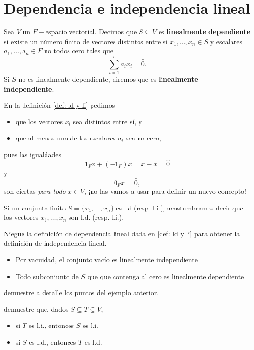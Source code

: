\section{Dependencia e independencia lineal}

\begin{defi}
	\label{def: ld y li}
Sea $V$ un $F-$espacio vectorial. Decimos que $S \subseteq V$
es \textbf{linealmente dependiente} si existe un número
finito de vectores distintos entre si $x_{1}, \ldots , x_{n} \in S$
y escalares $a_{1}, \ldots , a_{n} \in F$ no todos cero
tales que 
\[
\sum_{i=1}^{n} a_{i}x_{i} = \hat{0}.
\]
Si $S$ no es linealmente dependiente, diremos que es
\textbf{linealmente independiente}.
\end{defi}

En la definición \ref{def: ld y li}
pedimos
\begin{itemize}
	\item que los vectores $x_{i}$ sea distintos entre sí, y
	\item que al menos uno de los escalares $a_{i}$ sea no cero,
\end{itemize}
pues las igualdades
	\[
	1_{F} x + (-1_{F}) x = x - x = \hat{0}
	\]
	y
	\[
	0_{F} x = \hat{0},
	\]
	son ciertas \textit{para todo $x \in V$}, ¡no las vamos a usar
	para definir un nuevo concepto!
	
Si un conjunto finito $S = \{ x_{1}, \ldots , x_{n} \}$
es l.d.(resp. l.i.), acostumbramos decir que los vectores
$x_{1}, \ldots , x_{n}$ son l.d. (resp. l.i.).


Niegue la definición de dependencia lineal dada en 
\ref{def: ld y li} para obtener la definición de independencia lineal.

\begin{ejem}
\begin{itemize}
	\item Por vacuidad, el conjunto vacío es linealmente independiente
	\item Todo subconjunto de $S$ que que contenga al cero es
	linealmente dependiente
\end{itemize}
\diam

\end{ejem}
 demuestre a detalle los puntos del ejemplo anterior.

 demuestre que, dados $S \subseteq T \subseteq V$,
\begin{itemize}
	\item si $T$ es l.i., entonces $S$ es l.i.
	\item si $S$ es l.d., entonces $T$ es l.d. 
\end{itemize}

